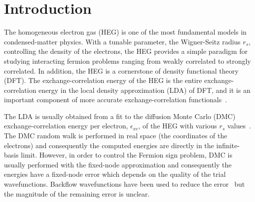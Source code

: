 \documentclass[%
reprint,
 superscriptaddress,
 amsmath,amssymb,
 aps,
]{revtex4-1}
\begin{document}
\section{Introduction}
The homogeneous electron gas (HEG) is one of the most fundamental models in condensed-matter physics.
With a tunable parameter, the Wigner-Seitz radius $r_s$, controlling the density of the electrons,
the HEG provides a simple paradigm for studying interacting fermion problems
ranging from weakly correlated to strongly correlated.
In addition, the HEG is a cornerstone of density functional theory (DFT).
The exchange-correlation energy of the HEG is the entire exchange-correlation energy in the
local density approximation (LDA) of DFT, and it is an important component of more accurate exchange-correlation functionals~\cite{ParYan-BOOK-89,DreGro-BOOK-90}.

The LDA is usually obtained from a fit to the diffusion Monte Carlo (DMC) exchange-correlation energy
per electron, $\epsilon_{xc}$, of the HEG with various $r_s$ values~\cite{CepAld-PRL-80}.
The DMC random walk is performed in real space (the coordinates of the electrons) and consequently
the computed energies are directly in the infinite-basis limit.
However, in order to control the Fermion sign problem, DMC is usually performed with the fixed-node approximation
and consequently the energies have a fixed-node error which depends on the
quality of the trial wavefunctions.
Backflow wavefunctions have been used to reduce the error~\cite{KwoCepMar-PRB-98,RioMaDruTowNee-PRE-06}
but the magnitude of the remaining error is unclear.
\end{document}
